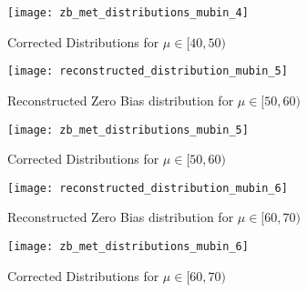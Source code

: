 \begin{figure}[h]
		\centering
		\texttt{[image: zb\_met\_distributions\_mubin\_4]}
		\caption{Corrected Distributions for $\mu \in [40,50)$}
\end{figure}
\begin{figure}[h]
		\centering
		\texttt{[image: reconstructed\_distribution\_mubin\_5]}
		\caption{Reconstructed Zero Bias distribution for $\mu\in [50,60)$}
\end{figure}
\begin{figure}[h]
		\centering
		\texttt{[image: zb\_met\_distributions\_mubin\_5]}
		\caption{Corrected Distributions for $\mu \in [50,60)$}
\end{figure}
\begin{figure}[h]
		\centering
		\texttt{[image: reconstructed\_distribution\_mubin\_6]}
		\caption{Reconstructed Zero Bias distribution for $\mu\in [60,70)$}
\end{figure}
\begin{figure}[h]
		\centering
		\texttt{[image: zb\_met\_distributions\_mubin\_6]}
		\caption{Corrected Distributions for $\mu \in [60,70)$}
\end{figure}
